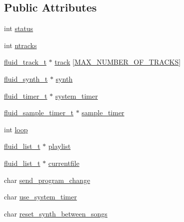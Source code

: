 \subsection*{Public Attributes}
\begin{DoxyCompactItemize}
\item 
int \hyperlink{struct__fluid__player__t_a8c697a8e813d952d09ee2b6e3946c4fb}{status}
\item 
int \hyperlink{struct__fluid__player__t_aac1360ac5e7b574a3b46e4138d59fa89}{ntracks}
\item 
\hyperlink{fluid__midi_8h_a81a9252c015f2b4173a2642a4507d74b}{fluid\+\_\+track\+\_\+t} $\ast$ \hyperlink{struct__fluid__player__t_abaf5bdaf07e59c4d0fb49f4361f2626d}{track} \mbox{[}\hyperlink{fluid__midi_8h_a2023050a49b937b6321b5236aac122c9}{M\+A\+X\+\_\+\+N\+U\+M\+B\+E\+R\+\_\+\+O\+F\+\_\+\+T\+R\+A\+C\+KS}\mbox{]}
\item 
\hyperlink{types_8h_ae265f10ae174a13afe010de50d87e1a4}{fluid\+\_\+synth\+\_\+t} $\ast$ \hyperlink{struct__fluid__player__t_af9313f8f8f6313fd14f3ecf9d26d90b5}{synth}
\item 
\hyperlink{fluid__sys_8h_a520742276ee4ea4bf140e6e6be79e4ae}{fluid\+\_\+timer\+\_\+t} $\ast$ \hyperlink{struct__fluid__player__t_a8780acf388964d3d59ad0815df1c699d}{system\+\_\+timer}
\item 
\hyperlink{fluidsynth__priv_8h_a4ddade88911e1873bccda1a7750a848c}{fluid\+\_\+sample\+\_\+timer\+\_\+t} $\ast$ \hyperlink{struct__fluid__player__t_a337ba1549b8460ca4e7be23088dca44f}{sample\+\_\+timer}
\item 
int \hyperlink{struct__fluid__player__t_a750a3c6034bd1fafbf80fe751a2ea123}{loop}
\item 
\hyperlink{fluid__list_8h_a3ef7535d4290862c0af118569223bd89}{fluid\+\_\+list\+\_\+t} $\ast$ \hyperlink{struct__fluid__player__t_a9c59652390dc6be784baf56d6c2eb876}{playlist}
\item 
\hyperlink{fluid__list_8h_a3ef7535d4290862c0af118569223bd89}{fluid\+\_\+list\+\_\+t} $\ast$ \hyperlink{struct__fluid__player__t_a1a51559ebd3986775518502545baa2a7}{currentfile}
\item 
char \hyperlink{struct__fluid__player__t_acf44858efd9c289b156aa87c65b9abac}{send\+\_\+program\+\_\+change}
\item 
char \hyperlink{struct__fluid__player__t_a1f215fdc1f459ac01cae1272ef191d23}{use\+\_\+system\+\_\+timer}
\item 
char \hyperlink{struct__fluid__player__t_a49f91063ada7e3fa43aad47eab2fe55d}{reset\+\_\+synth\+\_\+between\+\_\+songs}

\end{DoxyCompactItemize}
